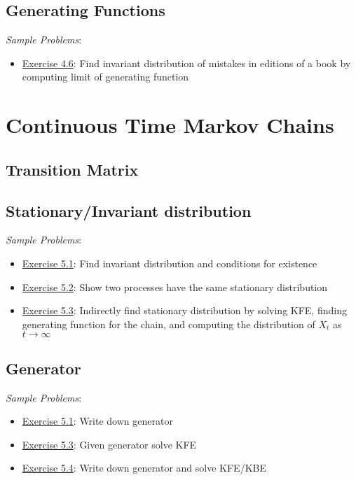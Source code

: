 \documentclass[12pt]{article}
\begin{document}
\subsection{Generating Functions}
\textit{Sample Problems}: 
\begin{itemize}[nolistsep]
    \item \hyperref[Exercise 4.6]{Exercise 4.6}: Find invariant distribution of mistakes in editions of a book by computing limit of generating function
\end{itemize}





\pagebreak
\section{Continuous Time Markov Chains}

\subsection{Transition Matrix}


\subsection{Stationary/Invariant distribution}

\textit{Sample Problems}: 
\begin{itemize}[nolistsep]
    \item \hyperref[Exercise 5.1]{Exercise 5.1}: Find invariant distribution and conditions for existence
    \item \hyperref[Exercise 5.2]{Exercise 5.2}: Show two processes have the same stationary distribution 
    \item \hyperref[Exercise 5.3]{Exercise 5.3}: Indirectly find stationary distribution by solving KFE, finding generating function for the chain, and computing the distribution of \( X_t \) as \( t\to\infty \)
\end{itemize}

\subsection{Generator}
\textit{Sample Problems}: 
\begin{itemize}[nolistsep]
    \item \hyperref[Exercise 5.1]{Exercise 5.1}: Write down generator
    \item \hyperref[Exercise 5.3]{Exercise 5.3}: Given generator solve KFE
    \item \hyperref[Exercise 5.4]{Exercise 5.4}: Write down generator and solve KFE/KBE
\end{itemize}
\end{document}
